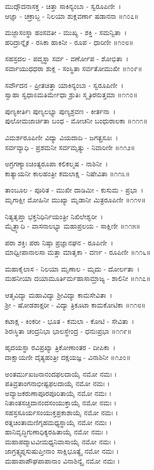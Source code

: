 ಮುದ್ಗೌದನಾಸಕ್ತ - ಚಿತ್ತಾ ಸಾಕಿನ್ಯಂಬಾ - ಸ್ವರೂಪಿಣೀ~।\\
ಆಜ್ಞಾ - ಚಕ್ರಾಬ್ಜ - ನಿಲಯಾ ಶುಕ್ಲವರ್ಣಾ ಷಡಾನನಾ ॥೧೦೭॥

ಮಜ್ಜಾಸಂಸ್ಥಾ ಹಂಸವತೀ - ಮುಖ್ಯ - ಶಕ್ತಿ - ಸಮನ್ವಿತಾ~।\\
ಹರಿದ್ರಾನ್ನೈಕ - ರಸಿಕಾ ಹಾಕಿನೀ - ರೂಪ - ಧಾರಿಣೀ ॥೧೦೮॥

ಸಹಸ್ರದಲ - ಪದ್ಮಸ್ಥಾ ಸರ್ವ - ವರ್ಣೋಪ - ಶೋಭಿತಾ~।\\
ಸರ್ವಾಯುಧಧರಾ ಶುಕ್ಲ - ಸಂಸ್ಥಿತಾ ಸರ್ವತೋಮುಖೀ ॥೧೦೯॥

ಸರ್ವೌದನ - ಪ್ರೀತಚಿತ್ತಾ ಯಾಕಿನ್ಯಂಬಾ - ಸ್ವರೂಪಿಣೀ~।\\
ಸ್ವಾಹಾ ಸ್ವಧಾಽಮತಿರ್ಮೇಧಾ ಶ್ರುತಿಃ ಸ್ಮೃತಿರನುತ್ತಮಾ ॥೧೧೦॥

ಪುಣ್ಯಕೀರ್ತಿಃ ಪುಣ್ಯಲಭ್ಯಾ ಪುಣ್ಯಶ್ರವಣ - ಕೀರ್ತನಾ~।\\
ಪುಲೋಮಜಾರ್ಚಿತಾ ಬಂಧ - ಮೋಚನೀ ಬಂಧುರಾಲಕಾ ॥೧೧೧॥

ವಿಮರ್ಶರೂಪಿಣೀ ವಿದ್ಯಾ ವಿಯದಾದಿ - ಜಗತ್ಪ್ರಸೂಃ~।\\
ಸರ್ವವ್ಯಾಧಿ - ಪ್ರಶಮನೀ ಸರ್ವಮೃತ್ಯು - ನಿವಾರಿಣೀ ॥೧೧೨॥

ಅಗ್ರಗಣ್ಯಾಽಚಿಂತ್ಯರೂಪಾ ಕಲಿಕಲ್ಮಷ - ನಾಶಿನೀ~।\\
ಕಾತ್ಯಾಯನೀ ಕಾಲಹಂತ್ರೀ ಕಮಲಾಕ್ಷ - ನಿಷೇವಿತಾ ॥೧೧೩॥

ತಾಂಬೂಲ - ಪೂರಿತ - ಮುಖೀ ದಾಡಿಮೀ - ಕುಸುಮ - ಪ್ರಭಾ~।\\
ಮೃಗಾಕ್ಷೀ ಮೋಹಿನೀ ಮುಖ್ಯಾ ಮೃಡಾನೀ ಮಿತ್ರರೂಪಿಣೀ ॥೧೧೪॥

ನಿತ್ಯತೃಪ್ತಾ ಭಕ್ತನಿಧಿರ್ನಿಯಂತ್ರೀ ನಿಖಿಲೇಶ್ವರೀ~।\\
ಮೈತ್ರ್ಯಾದಿ - ವಾಸನಾಲಭ್ಯಾ ಮಹಾಪ್ರಲಯ - ಸಾಕ್ಷಿಣೀ ॥೧೧೫॥

ಪರಾ ಶಕ್ತಿಃ ಪರಾ ನಿಷ್ಠಾ ಪ್ರಜ್ಞಾನಘನ - ರೂಪಿಣೀ~।\\
ಮಾಧ್ವೀಪಾನಾಲಸಾ ಮತ್ತಾ ಮಾತೃಕಾ - ವರ್ಣ - ರೂಪಿಣೀ ॥೧೧೬॥

ಮಹಾಕೈಲಾಸ - ನಿಲಯಾ ಮೃಣಾಲ - ಮೃದು - ದೋರ್ಲತಾ~।\\
ಮಹನೀಯಾ ದಯಾಮೂರ್ತಿರ್ಮಹಾಸಾಮ್ರಾಜ್ಯ - ಶಾಲಿನೀ ॥೧೧೭॥

ಆತ್ಮವಿದ್ಯಾ ಮಹಾವಿದ್ಯಾ ಶ್ರೀವಿದ್ಯಾ ಕಾಮಸೇವಿತಾ~।\\
ಶ್ರೀ - ಷೋಡಶಾಕ್ಷರೀ - ವಿದ್ಯಾ ತ್ರಿಕೂಟಾ ಕಾಮಕೋಟಿಕಾ ॥೧೧೮॥

ಕಟಾಕ್ಷ - ಕಿಂಕರೀ - ಭೂತ - ಕಮಲಾ - ಕೋಟಿ - ಸೇವಿತಾ~।\\
ಶಿರಃಸ್ಥಿತಾ ಚಂದ್ರನಿಭಾ ಭಾಲಸ್ಥೇಂದ್ರ - ಧನುಃಪ್ರಭಾ ॥೧೧೯॥

ಹೃದಯಸ್ಥಾ ರವಿಪ್ರಖ್ಯಾ ತ್ರಿಕೋಣಾಂತರ - ದೀಪಿಕಾ~।\\
ದಾಕ್ಷಾಯಣೀ ದೈತ್ಯಹಂತ್ರೀ ದಕ್ಷಯಜ್ಞ - ವಿನಾಶಿನೀ  ॥೧೨೦॥

ಅಂತರ್ಮುಖಜನಾನಂದಫಲದಾಯೈ ನಮೋ ನಮಃ ।\\
ಪತಿವ್ರತಾಂಗನಾಭೀಷ್ಟಫಲದಾಯೈ ನಮೋ ನಮಃ ।\\
ಅವ್ಯಾಜಕರುಣಾಪೂರಪೂರಿತಾಯೈ ನಮೋ ನಮಃ ।\\
ನಿತಾಂತಸಚ್ಚಿದಾನಂದಸಂಯುಕ್ತಾಯೈ ನಮೋ ನಮಃ ।\\
ಸಹಸ್ರಸೂರ್ಯಸಂಯುಕ್ತಪ್ರಕಾಶಾಯೈ ನಮೋ ನಮಃ ।\\
ರತ್ನಚಿಂತಾಮಣಿಗೃಹಮಧ್ಯಸ್ಥಾಯೈ ನಮೋ ನಮಃ ।\\
ಹಾನಿವೃದ್ಧಿಗುಣಾಧಿಕ್ಯರಹಿತಾಯೈ ನಮೋ ನಮಃ ।\\
ಮಹಾಪದ್ಮಾಟವೀಮಧ್ಯನಿವಾಸಾಯೈ ನಮೋ ನಮಃ ।\\
ಜಾಗ್ರತ್ಸ್ವಪ್ನಸುಷುಪ್ತೀನಾಂ ಸಾಕ್ಷಿಭೂತ್ಯೈ ನಮೋ ನಮಃ ।\\
ಮಹಾಪಾಪೌಘಪಾಪಾನಾಂ ವಿನಾಶಿನ್ಯೈ ನಮೋ ನಮಃ ।

